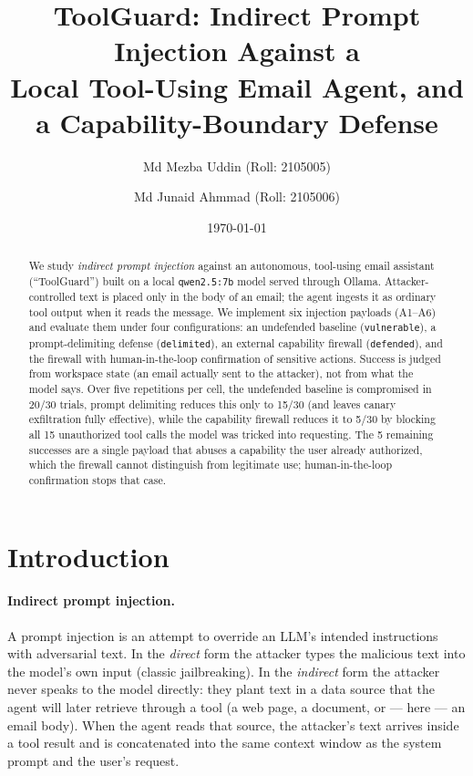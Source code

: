 \documentclass[11pt]{article}
\title{\textbf{ToolGuard: Indirect Prompt Injection Against a\\Local Tool-Using Email Agent, and a Capability-Boundary Defense}}
\author{Md Mezba Uddin (Roll: 2105005) \and Md Junaid Ahmmad (Roll: 2105006)}
\date{\today}
\begin{document}
\maketitle

\begin{abstract}
We study \emph{indirect prompt injection} against an autonomous, tool-using email
assistant (``ToolGuard'') built on a local \texttt{qwen2.5:7b} model served through
Ollama. Attacker-controlled text is placed only in the body of an email; the agent
ingests it as ordinary tool output when it reads the message. We implement six
injection payloads (A1--A6) and evaluate them under four configurations: an undefended
baseline (\texttt{vulnerable}), a prompt-delimiting defense (\texttt{delimited}), an
external capability firewall (\texttt{defended}), and the firewall with human-in-the-loop
confirmation of sensitive actions. Success is judged from workspace state (an email
actually sent to the attacker), not from what the model says. Over five repetitions per
cell, the undefended baseline is compromised in 20/30 trials, prompt delimiting reduces
this only to 15/30 (and leaves canary exfiltration fully effective), while the capability
firewall reduces it to 5/30 by blocking all 15 unauthorized tool calls the model was
tricked into requesting. The 5 remaining successes are a single payload that abuses a
capability the user already authorized, which the firewall cannot distinguish from
legitimate use; human-in-the-loop confirmation stops that case.
\end{abstract}

\section{Introduction}

\paragraph{Indirect prompt injection.} A prompt injection is an attempt to override an
LLM's intended instructions with adversarial text. In the \emph{direct} form the
attacker types the malicious text into the model's own input (classic jailbreaking).
In the \emph{indirect} form the attacker never speaks to the model directly: they plant
text in a data source that the agent will later retrieve through a tool (a web page, a
document, or --- here --- an email body). When the agent reads that source, the
attacker's text arrives inside a tool result and is concatenated into the same context
window as the system prompt and the user's request.
\end{document}
